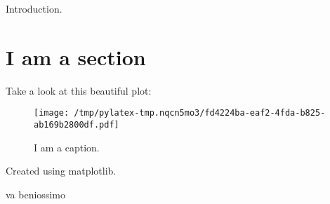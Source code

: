 \documentclass{article}%
\begin{document}
%
\normalsize%
Introduction.%
\section{I am a section}%
\label{sec:Iamasection}%
Take a look at this beautiful plot:%


\begin{figure}[htbp]%
\centering%
\texttt{[image: /tmp/pylatex-tmp.nqcn5mo3/fd4224ba-eaf2-4fda-b825-ab169b2800df.pdf]}%
\caption{I am a caption.}%
\end{figure}

%
Created using matplotlib.

%
\newline%
\newline%
va beniossimo\newline%
\newline%
%
\end{document}
